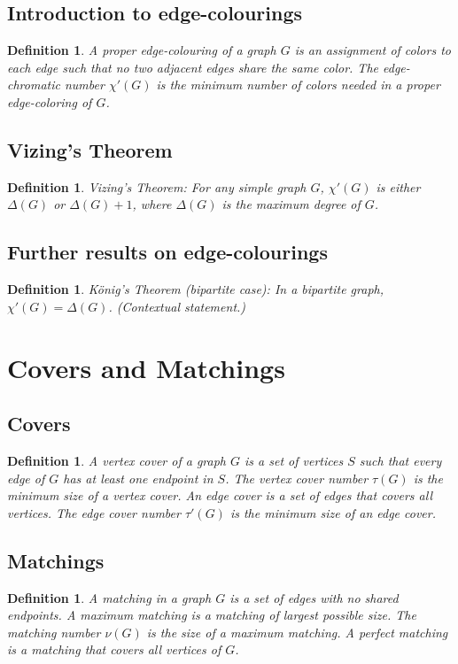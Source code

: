 \documentclass[11pt]{article}
\newtheorem{definition}[theorem]{Definition}
\begin{document}
\subsection{Introduction to edge-colourings}
\begin{definition}
A proper edge-colouring of a graph $G$ is an assignment of colors to each edge such that no two adjacent edges share the same color. The edge-chromatic number $\chi'(G)$ is the minimum number of colors needed in a proper edge-coloring of $G$.
\end{definition}
\subsection{Vizing's Theorem}
\begin{definition}
Vizing's Theorem: For any simple graph $G$, $\chi'(G)$ is either $\Delta(G)$ or $\Delta(G)+1$, where $\Delta(G)$ is the maximum degree of $G$.
\end{definition}
\subsection{Further results on edge-colourings}
\begin{definition}
König's Theorem (bipartite case): In a bipartite graph, $\chi'(G)=\Delta(G)$. (Contextual statement.)
\end{definition}
\section{Covers and Matchings}
\subsection{Covers}
\begin{definition}
A vertex cover of a graph $G$ is a set of vertices $S$ such that every edge of $G$ has at least one endpoint in $S$. The vertex cover number $\tau(G)$ is the minimum size of a vertex cover. An edge cover is a set of edges that covers all vertices. The edge cover number $\tau'(G)$ is the minimum size of an edge cover.
\end{definition}
\subsection{Matchings}
\begin{definition}
A matching in a graph $G$ is a set of edges with no shared endpoints. A maximum matching is a matching of largest possible size. The matching number $\nu(G)$ is the size of a maximum matching. A perfect matching is a matching that covers all vertices of $G$.
\end{definition}
\end{document}
